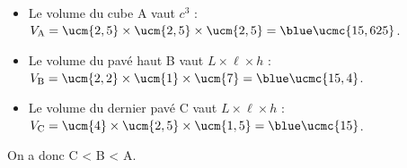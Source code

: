 \ \\ [-5mm]
   \begin{itemize}
      \item Le volume du cube A vaut $c^3$ : \\
      $V_{\text A} =\ucm{2,5}\times\ucm{2,5}\times\ucm{2,5} ={\blue \ucmc{15,625}}$.
      \item Le volume du pavé haut B vaut $L\times\ell\times h$ : \\
      $V_{\text B} =\ucm{2,2}\times\ucm{1}\times\ucm{7} ={\blue \ucmc{15,4}}$.
      \item Le volume du dernier pavé C vaut $L\times\ell\times h$ : \\
      $V_{\text C} =\ucm{4}\times\ucm{2,5}\times\ucm{1,5} ={\blue \ucmc{15}}$.
   \end{itemize}
   On a donc {\blue C < B < A}. \\
